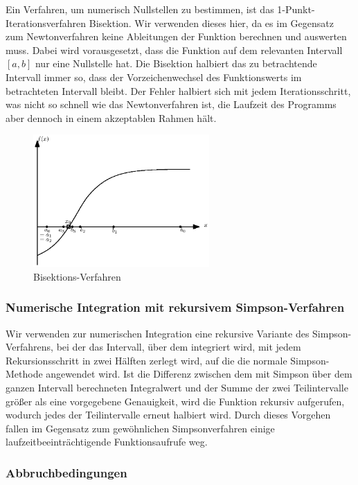 \documentclass[10pt,a4paper]{article}
\begin{document}
Ein Verfahren, um numerisch Nullstellen zu bestimmen, ist das 1-Punkt-Iterationsverfahren Bisektion. Wir verwenden dieses hier, da es im Gegensatz zum Newtonverfahren keine Ableitungen der Funktion berechnen und auswerten muss. Dabei wird vorausgesetzt, dass die Funktion auf dem relevanten Intervall $[a,b]$ nur eine Nullstelle hat. Die Bisektion halbiert das zu betrachtende Intervall immer so, dass der Vorzeichenwechsel des Funktionswerts im betrachteten Intervall bleibt. Der Fehler halbiert sich mit jedem Iterationsschritt, was nicht so schnell wie das Newtonverfahren ist, die Laufzeit des Programms aber dennoch in einem akzeptablen Rahmen hält.
\begin{figure}[tbp]
\centering
\includegraphics[width=0.6\textwidth]{./figures/bisektion.eps}
\caption{Bisektions-Verfahren}
\label{fig:bisektion}
\end{figure}

\subsubsection{Numerische Integration mit rekursivem Simpson-Verfahren}

Wir verwenden zur numerischen Integration eine rekursive Variante des Simpson-Verfahrens, bei der das Intervall, über dem integriert wird, mit jedem Rekursionsschritt in zwei Hälften zerlegt wird, auf die die normale Simpson-Methode angewendet wird. Ist die Differenz zwischen dem mit Simpson über dem ganzen Intervall berechneten Integralwert und der Summe der zwei Teilintervalle größer als eine vorgegebene Genauigkeit, wird die Funktion rekursiv aufgerufen, wodurch jedes der Teilintervalle erneut halbiert wird. Durch dieses Vorgehen fallen im Gegensatz zum gewöhnlichen Simpsonverfahren einige laufzeitbeeinträchtigende Funktionsaufrufe weg.

\subsubsection{Abbruchbedingungen}
\end{document}
